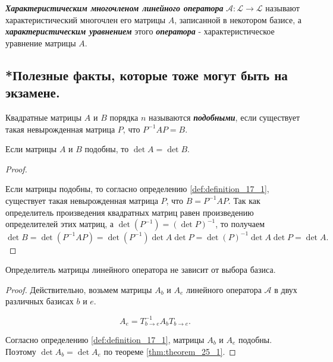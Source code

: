 \begin{definition}
    \textbf{\textit{Характеристическим многочленом линейного оператора}} $\mathscr{A} \colon \mathcal{L} \to \mathcal{L}$ называют характеристический многочлен его матрицы $A$, записанной в некотором базисе, а \textbf{\textit{характеристическим уравнением}} этого \textbf{\textit{оператора}} - характеристическое уравнение матрицы $A$.
\end{definition}


\subsection{
    *Полезные факты, которые тоже могут быть на экзамене.
}

\begin{definition}
    Квадратные матрицы $A$ и $B$ порядка $n$ называются \textit{\textbf{подобными}}, если существует такая невырожденная матрица $P$, что $P^{-1}AP = B$.
    \label{def:definition_17_1}
\end{definition}

\begin{theorem}
    Если матрицы $A$ и $B$ подобны, то $\det A = \det B$.
    \label{thm:theorem_25_1}
\end{theorem}

\begin{proof}~

    Если матрицы подобны, то согласно определению \eqref{def:definition_17_1}, существует такая невырожденная матрица $P$, что $B = P^{-1}AP$. Так как определитель произведения квадратных матриц равен произведению определителей этих матриц, а $\det(P^{-1}) = (\det P)^{-1}$, то получаем
    $$\det B = \det(P^{-1}AP) = \det(P^{-1})\det A \det P = \det(P)^{-1}\det A \det P = \det A.$$
\end{proof}

\begin{corollary}
    Определитель матрицы линейного оператора не зависит от выбора базиса.
\end{corollary}

\begin{proof}
    Действительно, возьмем матрицы $A_b$ и $A_e$ линейного оператора $\mathscr{A}$ в двух различных базисах $b$ и $e$.

    $$A_e = T^{-1}_{b \to e}A_bT_{b \to e}.$$

    Согласно определению \eqref{def:definition_17_1}, матрицы $A_b$ и $A_e$ подобны. Поэтому $\det A_b = \det A_e$ по теореме \ref{thm:theorem_25_1}.
\end{proof}


